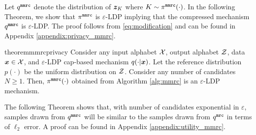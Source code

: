 Let $q^{\texttt{mmrc}}$ denote the distribution of ${\boldsymbol{z}}_K$ where $K \sim \pi^{\texttt{mmrc}}(\cdot)$.
In the following Theorem, we show that $\pi^{\texttt{mmrc}}$ is $\varepsilon$-LDP implying that the compressed mechanism $q^{\texttt{mmrc}}$ is $\varepsilon$-LDP. The proof follows from \eqref{eq:modification} and can be found in Appendix \ref{appendix:privacy_mmrc}.
\begin{restatable}{theorem}{mmrcprivacy}\label{theorem:mmrc_privacy}
Consider any input alphabet $\mathcal{X}$, output alphabet $\mathcal{Z}$, data ${\boldsymbol{x}} \in \mathcal{X}$, and $\varepsilon$-LDP cap-based mechanism $q(\cdot|{\boldsymbol{x}})$.
Let the reference distribution $p(\cdot)$ be the uniform distribution on $\mathcal{Z}$. Consider any number of candidates $N \geq 1$. Then, $\pi^{\texttt{mmrc}}(\cdot)$ obtained from Algorithm \ref{alg:mmrc} is an $\varepsilon$-LDP mechanism.
\end{restatable}
The following Theorem shows that, with number of candidates exponential in $\varepsilon$, samples drawn from $q^{\texttt{mmrc}}$ will be similar to the samples drawn from $q^{\texttt{mrc}}$ in terms of $\ell_2$ error. A proof can be found in Appendix \ref{appendix:utility_mmrc}.

